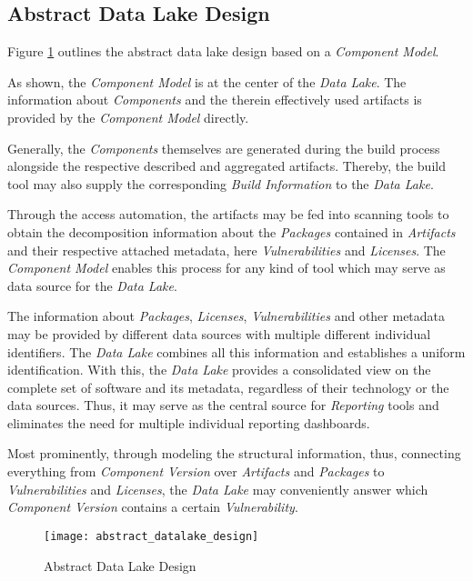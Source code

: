 \subsection{Abstract Data Lake Design}
Figure \ref{fig:AbstractDataLakeDesign} outlines the abstract data lake design based on a \emph{Component Model}.\par
As shown, the \emph{Component Model} is at the center of the \emph{Data Lake}. The information about \emph{Components} and the therein effectively used artifacts is provided by the \emph{Component Model} directly.\par
Generally, the \emph{Components} themselves are generated during the build process alongside the respective described and aggregated artifacts. Thereby, the build tool may also supply the corresponding \emph{Build Information} to the \emph{Data Lake}.\par
Through the access automation, the artifacts may be fed into scanning tools to obtain the  decomposition information about the \emph{Packages} contained in \emph{Artifacts} and their respective attached metadata, here \emph{Vulnerabilities} and \emph{Licenses}. The \emph{Component Model} enables this process for any kind of tool which may serve as data source for the \emph{Data Lake}.\par
The information about \emph{Packages}, \emph{Licenses}, \emph{Vulnerabilities} and other metadata may be provided by different data sources with multiple different individual identifiers. The \emph{Data Lake} combines all this information and establishes a uniform identification. With this, the \emph{Data Lake} provides a consolidated view on the complete set of software and its metadata, regardless of their technology or the data sources. Thus, it may serve as the central source for \emph{Reporting} tools and eliminates the need for multiple individual reporting dashboards.\par
Most prominently, through modeling the structural information, thus, connecting everything from \emph{Component Version} over \emph{Artifacts} and \emph{Packages} to \emph{Vulnerabilities} and \emph{Licenses}, the \emph{Data Lake} may conveniently answer which \emph{Component Version} contains a certain \emph{Vulnerability}. 

\begin{figure}[H]
	\centering
	\texttt{[image: abstract\_datalake\_design]}
	\caption[Abstract Data Lake Design]{Abstract Data Lake Design }
	\label{fig:AbstractDataLakeDesign}
\end{figure}


